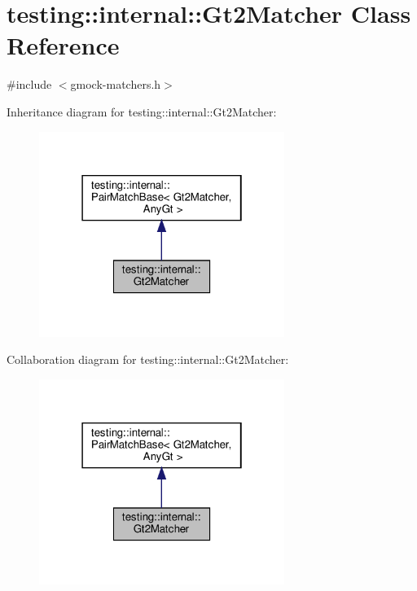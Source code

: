 \hypertarget{classtesting_1_1internal_1_1_gt2_matcher}{}\section{testing\+:\+:internal\+:\+:Gt2\+Matcher Class Reference}
\label{classtesting_1_1internal_1_1_gt2_matcher}


{\ttfamily \#include $<$gmock-\/matchers.\+h$>$}



Inheritance diagram for testing\+:\+:internal\+:\+:Gt2\+Matcher\+:
\nopagebreak
\begin{figure}[H]
\begin{center}
\leavevmode
\includegraphics[width=226pt]{classtesting_1_1internal_1_1_gt2_matcher__inherit__graph}
\end{center}
\end{figure}


Collaboration diagram for testing\+:\+:internal\+:\+:Gt2\+Matcher\+:
\nopagebreak
\begin{figure}[H]
\begin{center}
\leavevmode
\includegraphics[width=226pt]{classtesting_1_1internal_1_1_gt2_matcher__coll__graph}
\end{center}
\end{figure}

